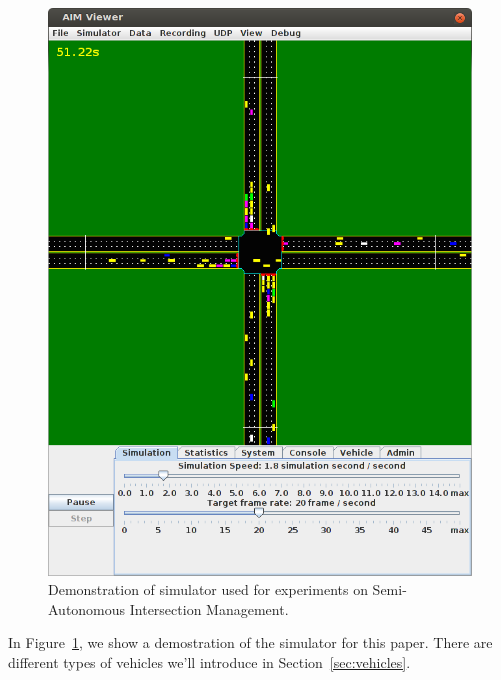 \begin{figure}
\centering
\includegraphics[width=0.8\columnwidth]{figures/demo.png}
\caption{Demonstration of simulator used for experiments on
Semi-Autonomous Intersection Management. }
\label{fig:demo}
\end{figure}

In Figure~\ref{fig:demo}, we show a demostration of the simulator for
this paper. There are different types of vehicles we'll introduce in
Section~\ref{sec:vehicles}.




